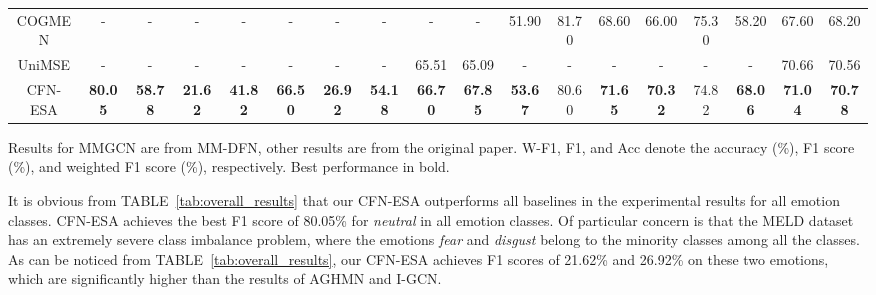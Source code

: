 \documentclass[journal]{IEEEtran}
\begin{document}
\begin{table*}[htbp]
\begin{threeparttable}
\begin{tabular}{c|ccccccc|cc|cccccc|cc}
	COGMEN & - & - & - & - & - & - & - & - & - & 51.90 & 81.70 & 68.60 & 66.00 & 75.30 & 58.20 & 67.60 &68.20 \\
	UniMSE   & - & - & - & - & - & - & -  &65.51 &65.09 & - & - & - & - & - & -  &70.66 &70.56 \\
	\hline
	CFN-ESA   & \textbf{80.05} & \textbf{58.78} & \textbf{21.62}  & \textbf{41.82} & \textbf{66.50} & \textbf{26.92} & \textbf{54.18} & \textbf{66.70} &\textbf{67.85} & \textbf{53.67} & 80.60  & \textbf{71.65} & \textbf{70.32} & 74.82 & \textbf{68.06} & \textbf{71.04} &\textbf{70.78} \\
      \hline
    \end{tabular}\begin{tablenotes}
        \footnotesize
        \item Results for MMGCN are from MM-DFN, other results are from the original paper. W-F1, F1, and Acc denote the accuracy (\%), F1 score (\%), and weighted F1 score (\%), respectively. Best performance in bold.
    \end{tablenotes}
    \end{threeparttable}
    \label{tab:overall_results}\end{table*}

It is obvious from TABLE~\ref{tab:overall_results} that our CFN-ESA outperforms all baselines in the experimental results for all emotion classes. CFN-ESA achieves the best F1 score of 80.05\% for \textit{neutral} in all emotion classes. Of particular concern is that the MELD dataset has an extremely severe class imbalance problem, where the emotions \textit{fear} and \textit{disgust} belong to the minority classes among all the classes. As can be noticed from TABLE~\ref{tab:overall_results}, our CFN-ESA achieves F1 scores of 21.62\% and 26.92\% on these two emotions, which are significantly higher than the results of AGHMN and I-GCN. 
\end{document}

